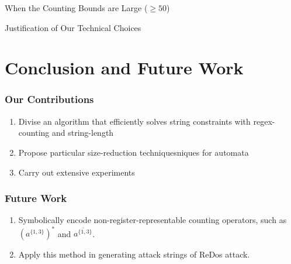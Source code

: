 \documentclass[landscape]{beamer}
\begin{document}
\begin{frame}{When the Counting Bounds are Large ($\geq 50$)}
  \centering
  
\end{frame}

\begin{frame}{Justification of Our Technical Choices}
  \centering
  
\end{frame}

\section{Conclusion and Future Work}
\begin{frame}
  \frametitle{Our Contributions}
  \begin{enumerate}
    \item Divise an algorithm that efficiently solves string constraints with regex-counting and string-length
    \item Propose particular size-reduction techniquesniques for automata
    \item Carry out extensive experiments
  \end{enumerate}
\end{frame}


\begin{frame}
  \frametitle{Future Work}
  \begin{enumerate}
    \item Symbolically encode non-register-representable counting operators, such as $(a^{\{1,3\}})^*$ and $\overline{a^{\{1,3\}}}$.
    \item Apply this method in generating attack strings of ReDos attack.
  \end{enumerate}
\end{frame}
\end{document}
